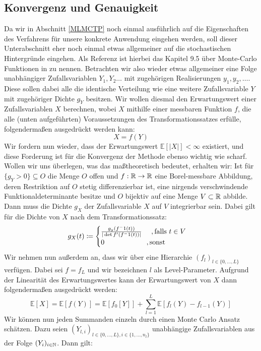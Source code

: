 \subsection{Konvergenz und Genauigkeit}
Da wir in Abschnitt \ref{MLMCTP} noch einmal ausführlich auf die Eigenschaften des Verfahrens für unsere konkrete Anwendung eingehen werden, soll dieser Unterabschnitt eher noch einmal etwas allgemeiner auf die stochastischen Hintergründe eingehen. Als Referenz ist hierbei das Kapitel 9.5 über Monte-Carlo Funktionen in \cite{sullivan2015introduction} zu nennen. 
Betrachten wir also wieder etwas allgemeiner eine Folge unabhängiger Zufallsvariablen $ Y_{1},Y_{2}\dots$ mit zugehörigen Realisierungen $ y_{1}, y_{2},\dots $. Diese sollen dabei alle die identische Verteilung wie eine weitere Zufallsvariable $ Y $ mit zugehöriger Dichte $ g_Y $ besitzen.
Wir wollen diesmal den Erwartungswert einer Zufallsvariablen $ X $ berechnen, wobei $ X $ mithilfe einer messbaren Funktion $ f $, die alle (unten aufgeführten) Voraussetzungen des Transformationssatzes erfülle, folgendermaßen ausgedrückt werden kann:
\[
	X = f(Y)
\]
Wir fordern nun wieder, dass der Erwartungswert $ \mathbb{E}[|X|] < \infty $ existiert, und diese Forderung ist für die Konvergenz der Methode ebenso wichtig wie scharf. Wollen wir uns überlegen, was das maßtheoretisch bedeutet, erhalten wir:
Ist für  $  \{ g_Y > 0 \} \subseteq O $ die Menge $ O $ offen und $ f:\mathbb{R} \to \mathbb{R} $ eine Borel-messbare Abbildung, deren Restriktion auf $ O $ stetig differenzierbar ist, eine nirgends verschwindende Funktionaldeterminante besitze und $ O $ bijektiv auf eine Menge $ V \subset \mathbb{R} $ abbilde.
Dann muss die Dichte $ g_X $ der Zufallsvariable $ X $ auf $ V $ integrierbar sein. Dabei gilt für die Dichte von $ X $ nach dem Transformationssatz:
\[
 	g_X(t) \coloneqq 
 	\begin{cases}
 	\frac{g_y(f^-1(t))}{| \det f'(f^-1(t)) |} \ \quad ,\text{falls }t\in V\\
 	0 \qquad \qquad \qquad, \text{sonst} 	
 	\end{cases}
\]
Wir nehmen nun außerdem an, dass wir über eine Hierarchie 
$ (f_l)_{l \in \{ 0,\dots,L \} } $ verfügen. Dabei sei $ f = f_L $ und wir bezeichnen $ l $ als Level-Parameter.
Aufgrund der Linearität des Erwartungswertes kann der Erwartungswert von $ X $ dann folgendermaßen ausgedrückt werden:
\[
	\mathbb{E}[X] = \mathbb{E}[f(Y)] = \mathbb{E}[f_0[Y]] + \sum_{l=1}^{L} \mathbb{E}[f_l(Y) - f_{l-1}(Y)]
\]
Wir können nun jeden Summanden einzeln durch einen Monte Carlo Ansatz schätzen. Dazu seien $ (Y_{l,i})_{l\in\{0,\dots,L\},i \in \{1,\dots,n_l \} }  $ unabhängige Zufallsvariablen aus der Folge $ (Y_i)_{i \in \mathbb{N}} $. Dann gilt:
